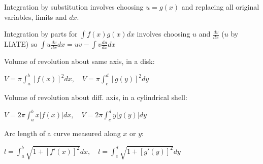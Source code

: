\documentclass[12pt, a4paper]{article}
\begin{document}
\begin{multicols*}{3}
Integration by substitution involves choosing $u=g(x)$ and replacing all original variables, limits and $dx$.

Integration by parts for $\int f(x)g(x)dx$ involves choosing $u$ and $\frac{dv}{dx}$ ($u$ by LIATE) so $\int u \frac{dv}{dx}dx = uv - \int v \frac{du}{dx} dx$

Volume of revolution about same axis, in a disk:\\
{\centering
  $V = \pi\int^b_a [f(x)]^2dx,\quad V=\pi\int^d_c[g(y)]^2dy$
\par}
\vspace{-0.5em}
Volume of revolution about diff. axis, in a cylindrical shell:\\
{\centering
  $V = 2\pi\int^b_a x|f(x)|dx,\quad V = 2\pi\int^d_c y|g(y)|dy$
\par}

Arc length of a curve measured along $x$ or $y$:\\
{\centering
  $l = \int^b_a \sqrt{1+[f'(x)]^2}dx,\quad l=\int^d_c \sqrt{1+[g'(y)]^2}dy$
\par}


\end{multicols*}
\end{document}
